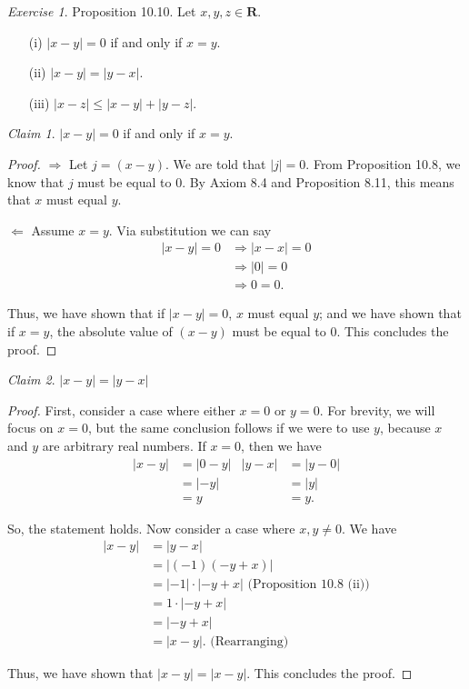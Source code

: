\documentclass[12pt,oneside]{amsart}
\theoremstyle{remark}
\newtheorem{exer}{Exercise}
\newtheorem{claim}{Claim}[exer]
\newcommand{\bfR}{\mathbf{R}}
\begin{document}
%
%
%
%
\newpage
\begin{exer}
Proposition 10.10. Let $x, y, z \in \bfR$.
\begin{itemize}
  \item[ (i) ] $|x - y| = 0$ if and only if $x = y$.
  \item[ (ii) ] $|x - y| = |y - x|$.
  \item[ (iii) ] $|x - z| \leq |x - y| + |y - z|$.
\end{itemize}
\end{exer}
\begin{claim}
$|x - y| = 0$ if and only if $x = y$.
\end{claim}
\begin{proof}
$\Rightarrow$ Let $j = (x - y)$. We  are told that $|j| = 0$. From Proposition 10.8, we know that $j$ must be equal to 0. By Axiom 8.4 and Proposition 8.11, this means that $x$ must equal $y$.

$\Leftarrow$ Assume $x = y$. Via substitution we can say
\begin{equation}
\begin{split}
|x - y| = 0 &\Rightarrow |x - x| = 0 \\
            &\Rightarrow     |0| = 0 \\
            &\Rightarrow       0 = 0.
\end{split}
\end{equation}

Thus, we have shown that if $|x - y| = 0$, $x$ must equal $y$; and we have shown that if $x = y$, the absolute value of $(x - y)$ must be equal to 0. This concludes the proof.
\end{proof}

\begin{claim}
$|x - y| = |y - x|$
\end{claim}
\begin{proof}
First, consider a case where either $x = 0$ or $y = 0$. For brevity, we will focus on $x = 0$, but the same conclusion follows if we were to use $y$, because $x$ and $y$ are arbitrary real numbers. If $x = 0$, then we have
\begin{align*}
|x - y| &= |0 - y|  &  |y - x| &= |y - 0| \\
        &= |-y|     &          &= |y| \\
        &= y        &          &= y.
\end{align*}

So, the statement holds. Now consider a case where $x,y \neq 0$. We have
\begin{align*}
|x - y| &= |y - x| \\
        &= |(-1)(-y + x)| \\
        &= |-1| \cdot |-y + x| \text{ (Proposition 10.8 (ii))} \\
        &= 1 \cdot |-y + x| \\
        &= |-y + x| \\
        &= |x - y|. \text{ (Rearranging)}
\end{align*}

Thus, we have shown that $|x - y| = |x - y|$. This concludes the proof.
\end{proof}
\end{document}

